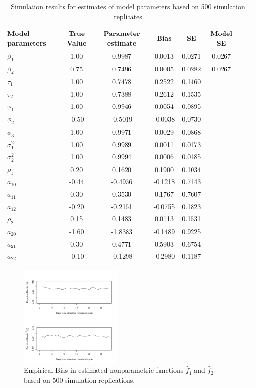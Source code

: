 \documentclass[12pt, notitlepage]{article}
\begin{document}
\begin{table}
\centering
\caption{Simulation results for estimates of model parameters based on 500 simulation replicates} 
\label{tableSim}
\begin{tabular}{l*{6}{c}r}
\hline
\hline
Model parameters & True Value &  Parameter estimate &  Bias &  SE  & Model SE\\
\hline
$\beta_1$   &  1.00     &  0.9987     &  0.0013     & 0.0271   & 0.0267    \\
$\beta_2$   &  0.75     &  0.7496     &  0.0005     & 0.0282    & 0.0267   \\
$\tau_1$   &  1.00     &  0.7478     &  0.2522     & 0.1460      \\
$\tau_2$   &  1.00     &  0.7388     &  0.2612     & 0.1535      \\
$\phi_1$   &  1.00     &  0.9946     &  0.0054     & 0.0895      \\
$\phi_2$   & -0.50     & -0.5019     & -0.0038     & 0.0730      \\
$\phi_3$   &  1.00     &  0.9971     &  0.0029     & 0.0868      \\
$\sigma_1^2$   &  1.00     &  0.9989     &  0.0011     & 0.0173      \\
$\sigma_2^2$   &  1.00     &  0.9994     &  0.0006     & 0.0185      \\
$\rho_1$   &  0.20     &  0.1620     &  0.1900     & 0.1034      \\
$a_{10}$   & -0.44     & -0.4936     & -0.1218     & 0.7143      \\
$a_{11}$   &  0.30     &  0.3530     &  0.1767     & 0.7607      \\
$a_{12}$   & -0.20     & -0.2151     & -0.0755     & 0.1823      \\
$\rho_2$   &  0.15     &  0.1483     &  0.0113     & 0.1531      \\
$a_{20}$   & -1.60     & -1.8383     & -0.1489     & 0.9225      \\
$a_{21}$   &  0.30     &  0.4771     &  0.5903     & 0.6754      \\
$a_{22}$   & -0.10     & -0.1298     & -0.2980     & 0.1187      \\
\hline
\end{tabular}
\end{table}

\begin{figure} 
\centering
\includegraphics[width=50mm]{bivNOU_liu_Biasf.pdf}
\caption{Empirical Bias in estimated nonparametric functions $\hat f_1$ and $\hat f_2$ based on 500 simulation replications.}
\label{bias}
\end{figure}
\end{document}

